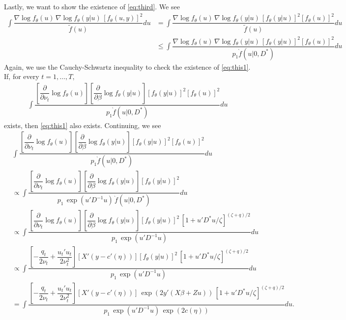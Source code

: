 \documentclass{article}
\begin{document}
Lastly, we want to show the existence of \eqref{eq:third}. We see
\begin{align}
\int \dfrac{  \nabla \log f_\theta (u)\,  \nabla \log f_\theta (y|u) \, \left[ f_\theta(u,y)\right]^2}{\tilde{f}(u)} du &=
\int \dfrac{  \nabla \log f_\theta (u) \, \nabla \log f_\theta (y|u) \, \left[ f_\theta(y|u)\right]^2 \left[ f_\theta(u)\right]^2}{\tilde{f}(u)} du \\
&\leq
\int \dfrac{  \nabla \log f_\theta (u) \,  \nabla \log f_\theta (y|u)\,  \left[ f_\theta(y|u)\right]^2 \left[ f_\theta(u)\right]^2}{p_1 \grave{f}(u|0,D^*)} du \label{eq:this1}
\end{align}
Again, we use the Cauchy-Schwartz inequality to check the existence of \eqref{eq:this1}. If, for every $t=1,\ldots,T$,
\begin{align}
\int \dfrac{ \left[ \dfrac{\partial}{\partial \nu_t}  \log f_\theta (u) \right] \left[  \dfrac{\partial}{\partial \beta} \log f_\theta (y|u) \right]   \left[ f_\theta(y|u)\right]^2 \left[ f_\theta(u)\right]^2}{p_1 \grave{f}(u|0,D^*)} du \label{eq:this1}
\end{align}
exists, then \eqref{eq:this1} also exists. Continuing, we see
\begin{align}
& \int \dfrac{ \left[ \dfrac{\partial}{\partial \nu_t}  \log f_\theta (u) \right] \left[  \dfrac{\partial}{\partial \beta} \log f_\theta (y|u) \right]   \left[ f_\theta(y|u)\right]^2 \left[ f_\theta(u)\right]^2}{p_1 \grave{f}(u|0,D^*)} du\\
 &\propto \int \dfrac{ \left[ \dfrac{\partial}{\partial \nu_t}  \log f_\theta (u) \right] \left[  \dfrac{\partial}{\partial \beta} \log f_\theta (y|u) \right]   \left[ f_\theta(y|u)\right]^2 }{p_1 \, \exp(u'D^{-1}u) \, \grave{f}(u|0,D^*)} du\\
 &\propto \int \dfrac{ \left[ \dfrac{\partial}{\partial \nu_t}  \log f_\theta (u) \right] \left[  \dfrac{\partial}{\partial \beta} \log f_\theta (y|u) \right]   \left[ f_\theta(y|u)\right]^2 \, \left[ 1+u'D^*u/\zeta  \right]^{(\zeta+q)/2} }{p_1 \, \exp(u'D^{-1}u) } du\\
&\propto \int \dfrac{ \left[      -\dfrac{q_t}{2 \nu_t} + \dfrac{u_t'u_t}{2 \nu_t^2}        \right] \left[  X'(y-c'(\eta)) \right]   \left[ f_\theta(y|u)\right]^2 \, \left[ 1+u'D^*u/\zeta  \right]^{(\zeta+q)/2} }{p_1 \, \exp(u'D^{-1}u) } du\\
&= \int \dfrac{ \left[      -\dfrac{q_t}{2 \nu_t} + \dfrac{u_t'u_t}{2 \nu_t^2}        \right] \left[  X'(y-c'(\eta)) \right]   \, \exp(2y'(X\beta+Zu)) \, \left[ 1+u'D^*u/\zeta  \right]^{(\zeta+q)/2} }{p_1 \, \exp(u'D^{-1}u) \, \exp(2 c(\eta)) } du. \label{eq:this2}
\end{align}
\end{document}
